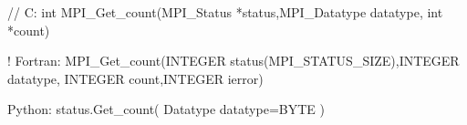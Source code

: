 // C:
int MPI_Get_count(MPI_Status *status,MPI_Datatype datatype,
    int *count)

! Fortran:
MPI_Get_count(INTEGER status(MPI_STATUS_SIZE),INTEGER datatype,
    INTEGER count,INTEGER ierror)

Python:
status.Get_count( Datatype datatype=BYTE )
